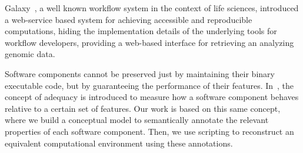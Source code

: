 

Galaxy~\cite{goecks2010galaxy}, a well known workflow system in the context of life sciences, introduced a web-service based system for achieving accessible and reproducible computations, hiding the implementation details of the underlying tools for workflow developers, providing a web-based interface for retrieving an analyzing genomic data. 





Software components cannot be preserved just by maintaining their binary executable code, but by guaranteeing the performance of their features. In~\cite{Matthews}, the concept of adequacy is introduced to measure how a software component behaves relative to a certain set of features. Our work is based on this same concept, where we build a conceptual model to semantically annotate the relevant properties of each software component. Then, we use scripting to reconstruct an equivalent computational environment using these annotations.


